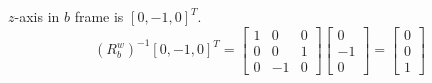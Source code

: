 \documentclass[answers]{exam}
\begin{document}
\begin{questions}
\begin{parts}
\begin{solution}
            $z$-axis in $b$ frame is $[0, -1, 0]^T$.
            \begin{equation*}
                (R^w_b)^{-1} [0, -1, 0]^T = \begin{bmatrix}
                    1 & 0  & 0 \\
                    0 & 0  & 1 \\
                    0 & -1 & 0
                \end{bmatrix}
                \begin{bmatrix}
                    0  \\
                    -1 \\
                    0
                \end{bmatrix}
                = \begin{bmatrix}
                    0 \\
                    0 \\
                    1
                \end{bmatrix}
            \end{equation*}

        \end{solution}


\end{parts}
\end{questions}
\end{document}
